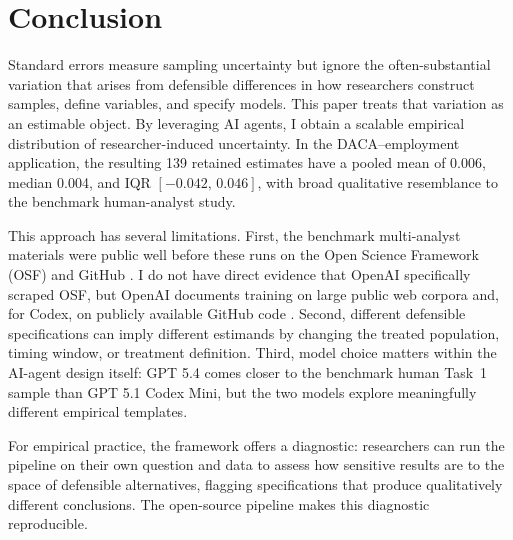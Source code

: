 \documentclass[12pt]{article}
\newcommand{\nhkmeta}{../NHK-replications/meta_analysis}
\begin{document}
\begin{table}[!htbp]
\centering
\caption{Point-estimate distribution by Copilot model}

\caption*{\textbf{Notes:} Statistics are computed over the same filtered sample used in Table~\ref{tab:nhk_summary}. Labels refer to the Copilot model used to generate and execute the combined phase~1--2 session.}
\label{tab:provider_comparison}
\end{table}
\FloatBarrier

\section{Conclusion}
\label{sec:conclusion}

Standard errors measure sampling uncertainty but ignore the often-substantial variation that arises from defensible differences in how researchers construct samples, define variables, and specify models. This paper treats that variation as an estimable object. By leveraging AI agents, I obtain a scalable empirical distribution of researcher-induced uncertainty. In the DACA--employment application, the resulting 139 retained estimates have a pooled mean of 0.006, median 0.004, and IQR $[-0.042,\,0.046]$, with broad qualitative resemblance to the benchmark human-analyst study.

This approach has several limitations. First, the benchmark multi-analyst materials were public well before these runs on the Open Science Framework (OSF) and GitHub \citep{nickchk2022manyeconomists, nickchk2023repldata, huntingtonklein2025sources}. I do not have direct evidence that OpenAI specifically scraped OSF, but OpenAI documents training on large public web corpora and, for Codex, on publicly available GitHub code \citep{brown2020gpt3, chen2021codex}. Second, different defensible specifications can imply different estimands by changing the treated population, timing window, or treatment definition. Third, model choice matters within the AI-agent design itself: GPT 5.4 comes closer to the benchmark human Task~1 sample than GPT 5.1 Codex Mini, but the two models explore meaningfully different empirical templates.

For empirical practice, the framework offers a diagnostic: researchers can run the pipeline on their own question and data to assess how sensitive results are to the space of defensible alternatives, flagging specifications that produce qualitatively different conclusions. The open-source pipeline makes this diagnostic reproducible.
\end{document}
